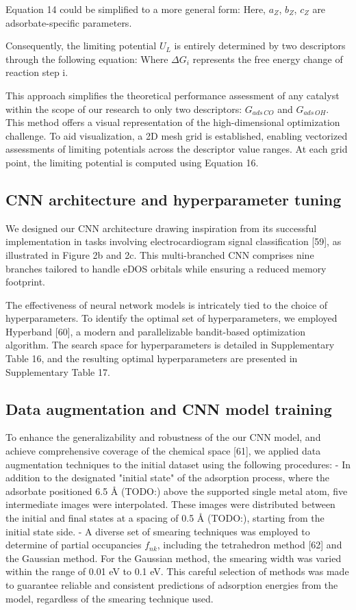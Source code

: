 Equation 14 could be simplified to a more general form:
Here, $a_Z$, $b_Z$, $c_Z$ are adsorbate-specific parameters.

Consequently, the limiting potential $\textit{U}_{L}$ is entirely determined by two descriptors through the following equation:
Where $\Delta G_{i}$ represents the free energy change of reaction step i.

This approach simplifies the theoretical performance assessment of any catalyst within the scope of our research to only two descriptors: $G_{\textit{ads} \, \textit{CO}}$ and $G_{\textit{ads} \, \textit{OH}}$.
This method offers a visual representation of the high-dimensional optimization challenge.
To aid visualization, a 2D mesh grid is established, enabling vectorized assessments of limiting potentials across the descriptor value ranges.
At each grid point, the limiting potential is computed using Equation 16.


\subsection{CNN architecture and hyperparameter tuning}
We designed our CNN architecture drawing inspiration from its successful implementation in tasks involving electrocardiogram signal classification [59], as illustrated in Figure 2b and 2c.
This multi-branched CNN comprises nine branches tailored to handle eDOS orbitals while ensuring a reduced memory footprint.

The effectiveness of neural network models is intricately tied to the choice of hyperparameters.
To identify the optimal set of hyperparameters, we employed Hyperband [60], a modern and parallelizable bandit-based optimization algorithm.
The search space for hyperparameters is detailed in Supplementary Table 16, and the resulting optimal hyperparameters are presented in Supplementary Table 17.


\subsection{Data augmentation and CNN model training}
To enhance the generalizability and robustness of the our CNN model, and achieve comprehensive coverage of the chemical space [61], we applied data augmentation techniques to the initial dataset using the following procedures:
	- In addition to the designated "initial state" of the adsorption process, where the adsorbate positioned 6.5 Å (TODO:) above the supported single metal atom, five intermediate images were interpolated. These images were distributed between the initial and final states at a spacing of 0.5 Å (TODO:), starting from the initial state side.
	- A diverse set of smearing techniques was employed to determine of partial occupancies $f_{nk}$, including the tetrahedron method [62] and the Gaussian method. For the Gaussian method, the smearing width was varied within the range of 0.01 eV to 0.1 eV. This careful selection of methods was made to guarantee reliable and consistent predictions of adsorption energies from the model, regardless of the smearing technique used.

